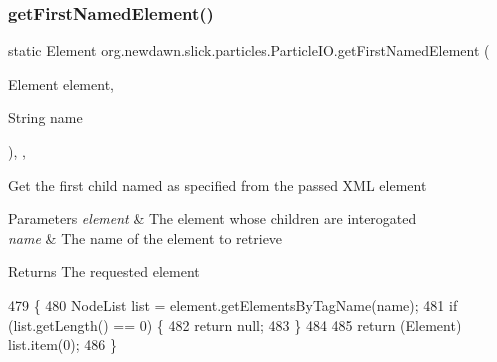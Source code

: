 \subsubsection{\texorpdfstring{get\+First\+Named\+Element()}{getFirstNamedElement()}}
{\footnotesize\ttfamily static Element org.\+newdawn.\+slick.\+particles.\+Particle\+I\+O.\+get\+First\+Named\+Element (\begin{DoxyParamCaption}\item[{Element}]{element,  }\item[{String}]{name }\end{DoxyParamCaption})\hspace{0.3cm}{\ttfamily [inline]}, {\ttfamily [static]}, {\ttfamily [private]}}

Get the first child named as specified from the passed X\+ML element


\begin{DoxyParams}{Parameters}
{\em element} & The element whose children are interogated \\
\hline
{\em name} & The name of the element to retrieve \\
\hline
\end{DoxyParams}
\begin{DoxyReturn}{Returns}
The requested element 
\end{DoxyReturn}

\begin{DoxyCode}
479                                                                               \{
480         NodeList list = element.getElementsByTagName(name);
481         \textcolor{keywordflow}{if} (list.getLength() == 0) \{
482             \textcolor{keywordflow}{return} null;
483         \}
484 
485         \textcolor{keywordflow}{return} (Element) list.item(0);
486     \}
\end{DoxyCode}
\mbox{\label{classorg_1_1newdawn_1_1slick_1_1particles_1_1_particle_i_o_a1da2bcc8784c9cf967326954bc3c9d33}} 
